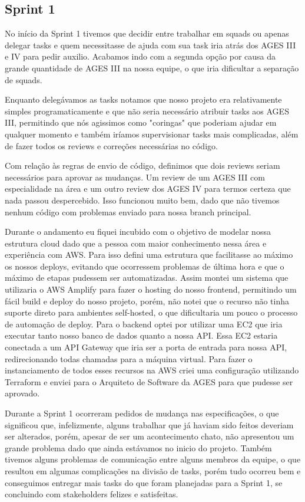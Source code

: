 \subsection{Sprint 1}

No início da Sprint 1 tivemos que decidir entre trabalhar em squads ou apenas delegar tasks e quem necessitasse de ajuda com sua task iria atrás dos AGES III e IV para pedir auxilio. Acabamos indo com a segunda opção por causa da grande quantidade de AGES III na nossa equipe, o que iria dificultar a separação de squads.

Enquanto delegávamos as tasks notamos que nosso projeto era relativamente simples programaticamente e que não seria necessário atribuir tasks aos AGES III, permitindo que nós agissimos como "coringas" que poderiam ajudar em qualquer momento e também iríamos supervisionar tasks mais complicadas, além de fazer todos os reviews e correções necessárias no código.

Com relação às regras de envio de código, definimos que dois reviews seriam necessários para aprovar as mudanças. Um review de um AGES III com especialidade na área e um outro review dos AGES IV para termos certeza que nada passou despercebido. Isso funcionou muito bem, dado que não tivemos nenhum código com problemas enviado para nossa branch principal.

Durante o andamento eu fiquei incubido com o objetivo de modelar nossa estrutura cloud dado que a pessoa com maior conhecimento nessa área e experiência com AWS. Para isso defini uma estrutura que facilitasse ao máximo os nossos deploys, evitando que ocorressem problemas de última hora e que o máximo de etapas pudessem ser automatizadas. Assim montei um sistema que utilizaria o AWS Amplify para fazer o hosting do nosso frontend, permitindo um fácil build e deploy do nosso projeto, porém, não notei que o recurso não tinha suporte direto para ambientes self-hosted, o que dificultaria um pouco o processo de automação de deploy. Para o backend optei por utilizar uma EC2 que iria executar tanto nosso banco de dados quanto a nossa API. Essa EC2 estaria conectada a um API Gateway que iria ser a porta de entrada para nossa API, redirecionando todas chamadas para a máquina virtual. Para fazer o instanciamento de todos esses recursos na AWS criei uma configuração utilizando Terraform e enviei para o Arquiteto de Software da AGES para que pudesse ser aprovado.

Durante a Sprint 1 ocorreram pedidos de mudança nas especificações, o que significou que, infelizmente, alguns trabalhar que já haviam sido feitos deveriam ser alterados, porém, apesar de ser um acontecimento chato, não apresentou um grande problema dado que ainda estávamos no inicio do projeto. Também tivemos alguns problemas de comunicação entre alguns membros da equipe, o que resultou em algumas complicações na divisão de tasks, porém tudo ocorreu bem e conseguimos entregar mais tasks do que foram planejadas para a Sprint 1, se concluindo com stakeholders felizes e satisfeitas.